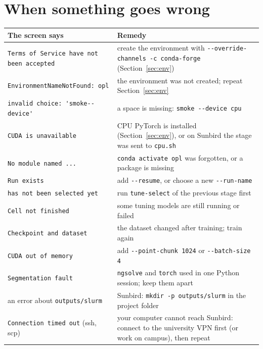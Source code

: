 \documentclass[11pt,a4paper]{article}
\newcommand{\code}[1]{\lstinline{#1}}
\begin{document}
\section{When something goes wrong}

\begin{center}
\begin{tabularx}{\textwidth}{@{}>{\raggedright\arraybackslash}p{}Y@{}}
\toprule
The screen says & Remedy \\
\midrule
\code{Terms of Service have not been accepted} & create the environment with \code{--override-channels -c conda-forge} (Section~\ref{sec:env}) \\
\code{EnvironmentNameNotFound: opl}     & the environment was not created; repeat Section~\ref{sec:env} \\
\code{invalid choice: 'smoke--device'}  & a space is missing: \code{smoke --device cpu} \\
\code{CUDA is unavailable}              & CPU PyTorch is installed (Section~\ref{sec:env}), or on Sunbird the stage was sent to \code{cpu.sh} \\
\code{No module named ...}              & \code{conda activate opl} was forgotten, or a package is missing \\
\code{Run exists}                       & add \code{--resume}, or choose a new \code{--run-name} \\
\code{has not been selected yet}        & run \code{tune-select} of the previous stage first \\
\code{Cell not finished}                & some tuning models are still running or failed \\
\code{Checkpoint and dataset}           & the dataset changed after training; train again \\
\code{CUDA out of memory}               & add \code{--point-chunk 1024} or \code{--batch-size 4} \\
\code{Segmentation fault}               & \code{ngsolve} and \code{torch} used in one Python session; keep them apart \\
an error about \code{outputs/slurm}     & Sunbird: \code{mkdir -p outputs/slurm} in the project folder \\
\code{Connection timed out} (ssh, scp)  & your computer cannot reach Sunbird: connect to the university VPN first (or work on campus), then repeat \\
\bottomrule
\end{tabularx}
\end{center}
\end{document}
